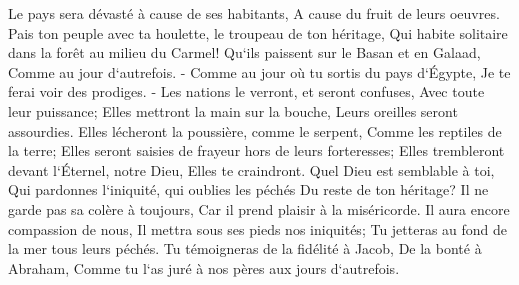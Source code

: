 \verse Le pays sera dévasté à cause de ses habitants, A cause du fruit de leurs oeuvres. 
\verse Pais ton peuple avec ta houlette, le troupeau de ton héritage, Qui habite solitaire dans la forêt au milieu du Carmel! Qu`ils paissent sur le Basan et en Galaad, Comme au jour d`autrefois. - 
\verse Comme au jour où tu sortis du pays d`Égypte, Je te ferai voir des prodiges. - 
\verse Les nations le verront, et seront confuses, Avec toute leur puissance; Elles mettront la main sur la bouche, Leurs oreilles seront assourdies. 
\verse Elles lécheront la poussière, comme le serpent, Comme les reptiles de la terre; Elles seront saisies de frayeur hors de leurs forteresses; Elles trembleront devant l`Éternel, notre Dieu, Elles te craindront. 
\verse Quel Dieu est semblable à toi, Qui pardonnes l`iniquité, qui oublies les péchés Du reste de ton héritage? Il ne garde pas sa colère à toujours, Car il prend plaisir à la miséricorde. 
\verse Il aura encore compassion de nous, Il mettra sous ses pieds nos iniquités; Tu jetteras au fond de la mer tous leurs péchés. 
\verse Tu témoigneras de la fidélité à Jacob, De la bonté à Abraham, Comme tu l`as juré à nos pères aux jours d`autrefois. 
